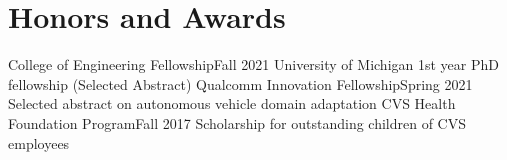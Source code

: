 \section{Honors and Awards}
  \CVSubHeadingListStart
    \CVSubheading
      {College of Engineering Fellowship}{Fall 2021}
      {University of Michigan 1st year PhD fellowship}{}
    \CVSubheading
      {(Selected Abstract) Qualcomm Innovation Fellowship}{Spring 2021}
      {Selected abstract on autonomous vehicle domain adaptation}{}
    \CVSubheading
      {CVS Health Foundation Program}{Fall 2017}
      {Scholarship for outstanding children of CVS employees}{}
  \CVSubHeadingListEnd